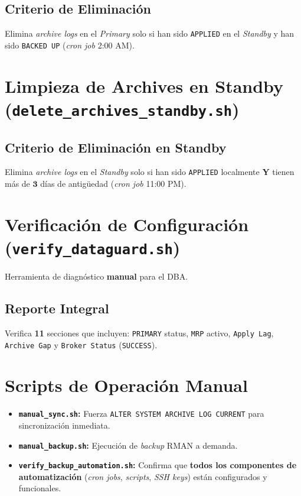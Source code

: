 \documentclass[11pt, a4paper]{report}
\begin{document}
\subsection{Criterio de Eliminación}
Elimina \textit{archive logs} en el \textit{Primary} solo si han sido \texttt{APPLIED} en el \textit{Standby} y han sido \texttt{BACKED UP} (\textit{cron job} 2:00 AM).
\section{Limpieza de Archives en Standby (\texttt{delete\_archives\_standby.sh})}

\subsection{Criterio de Eliminación en Standby}
Elimina \textit{archive logs} en el \textit{Standby} solo si han sido \texttt{APPLIED} localmente \textbf{Y} tienen más de $\mathbf{3}$ días de antigüedad (\textit{cron job} 11:00 PM).
\section{Verificación de Configuración (\texttt{verify\_dataguard.sh})}

Herramienta de diagnóstico \textbf{manual} para el DBA.
\subsection{Reporte Integral}
Verifica \textbf{11} secciones que incluyen: \texttt{PRIMARY} status, \texttt{MRP} activo, \texttt{Apply Lag}, \texttt{Archive Gap} y \texttt{Broker Status} (\texttt{SUCCESS}).
\section{Scripts de Operación Manual}

\begin{itemize}
    \item \textbf{\texttt{manual\_sync.sh}:} Fuerza \texttt{ALTER SYSTEM ARCHIVE LOG CURRENT} para sincronización inmediata.
\item \textbf{\texttt{manual\_backup.sh}:} Ejecución de \textit{backup} RMAN a demanda.
    \item \textbf{\texttt{verify\_backup\_automation.sh}:} Confirma que \textbf{todos los componentes de automatización} (\textit{cron jobs}, \textit{scripts}, \textit{SSH keys}) están configurados y funcionales.
\end{itemize}
\end{document}
